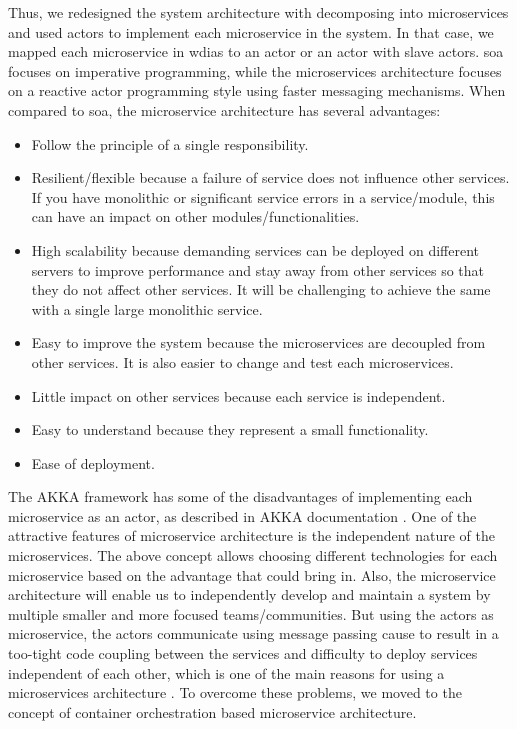 Thus, we redesigned the system architecture with decomposing into microservices and used actors to implement each microservice in the system. In that case, we mapped each microservice in \acrshort{wdias} to an actor or an actor with slave actors. \acrshort{soa} focuses on imperative programming, while the microservices architecture focuses on a reactive actor programming style using faster messaging mechanisms.
When compared to \acrshort{soa}, the microservice architecture has several advantages:
\begin{itemize}
    \item Follow the principle of a single responsibility.
    \item Resilient/flexible because a failure of service does not influence other services. If you have monolithic or significant service errors in a service/module, this can have an impact on other modules/functionalities.
    \item High scalability because demanding services can be deployed on different servers to improve performance and stay away from other services so that they do not affect other services. It will be challenging to achieve the same with a single large monolithic service.
    \item Easy to improve the system because the microservices are decoupled from other services. It is also easier to change and test each microservices.
    \item Little impact on other services because each service is independent.
    \item Easy to understand because they represent a small functionality.
    \item Ease of deployment.
\end{itemize}

The AKKA framework has some of the disadvantages of implementing each microservice as an actor, as described in AKKA documentation \cite{Akka.ioWhenCluster}. One of the attractive features of microservice architecture is the independent nature of the microservices. The above concept allows choosing different technologies for each microservice based on the advantage that could bring in. Also, the microservice architecture will enable us to independently develop and maintain a system by multiple smaller and more focused teams/communities. But using the actors as microservice, the actors communicate using message passing cause to result in a too-tight code coupling between the services and difficulty to deploy services independent of each other, which is one of the main reasons for using a microservices architecture \cite{Akka.ioWhenCluster}. To overcome these problems, we moved to the concept of container orchestration based microservice architecture.

